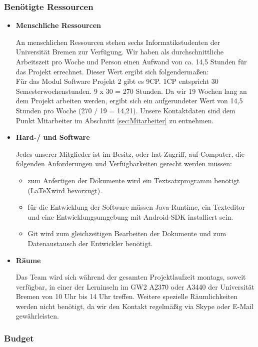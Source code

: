 \documentclass[fontsize=12pt,paper=a4,twoside]{scrartcl}
\begin{document}
\subsubsection{Benötigte Ressourcen}

\begin{itemize}
\item \textbf{Menschliche Ressourcen}

An menschlichen Ressourcen stehen sechs Informatikstudenten der Universität Bremen zur Verfügung. Wir haben als durchschnittliche Arbeitszeit pro Woche und Person einen Aufwand von ca. 14,5 Stunden für das Projekt errechnet. Dieser Wert ergibt sich folgendermaßen:\\
Für das Modul Software Projekt 2 gibt es 9CP. 1CP entspricht 30 Semesterwochenstunden. 9 x 30 = 270 Stunden. Da wir 19 Wochen lang an dem Projekt arbeiten werden, ergibt sich ein aufgerundeter Wert von 14,5 Stunden pro Woche (270 / 19 = 14,21). Unsere Kontaktdaten sind dem Punkt Mitarbeiter im Abschnitt \ref{sec:Mitarbeiter} zu entnehmen.

\item \textbf{Hard-/ und Software}

Jedes unserer Mitglieder ist im Besitz, oder hat Zugriff, auf Computer, die folgenden Anforderungen und Verfügbarkeiten gerecht werden müssen:

\begin{itemize}
\item zum Anfertigen der Dokumente wird ein Textsatzprogramm benötigt (\LaTeX wird bevorzugt).
\item für die Entwicklung der Software müssen Java-Runtime, ein Texteditor und eine Entwicklungsumgebung mit Android-SDK installiert sein.
\item Git wird zum gleichzeitigen Bearbeiten der Dokumente und zum Datenaustausch der Entwickler benötigt.
\end{itemize}

\item \textbf{Räume}

Das Team wird sich während der gesamten Projektlaufzeit montags, soweit verfügbar, in einer der Lerninseln im GW2 A2370 oder A3440 der Universität Bremen von 10 Uhr bis 14 Uhr treffen. Weitere spezielle Räumlichkeiten werden nicht benötigt, da wir den Kontakt regelmäßig via Skype oder E-Mail gewährleisten.

\end{itemize}

\subsubsection{Budget}
\end{document}

